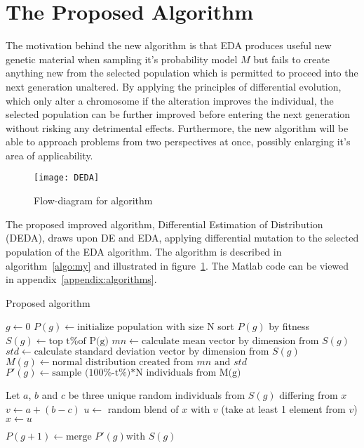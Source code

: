 \section{The Proposed Algorithm}

The motivation behind the new algorithm is that EDA produces useful new genetic material when sampling it's probability model $M$ but fails to create anything new from the selected population which is permitted to proceed into the next generation unaltered. By applying the principles of differential evolution, which only alter a chromosome if the alteration improves the individual, the selected population can be further improved before entering the next generation without risking any detrimental effects. Furthermore, the new algorithm will be able to approach problems from two perspectives at once, possibly enlarging it's area of applicability.

\begin{figure}[H]
  \centering
  \texttt{[image: DEDA]}
  \caption{Flow-diagram for algorithm}
  \label{fig:flowalg}
\end{figure}

The proposed improved algorithm, Differential Estimation of Distribution (DEDA), draws upon DE and EDA, applying differential mutation to the selected population of the EDA algorithm. The algorithm is described in algorithm~\ref{algo:my} and illustrated in figure~\ref{fig:flowalg}. The Matlab code can be viewed in appendix~\ref{appendix:algorithms}.


\begin{algorithm}[h]
  \caption{Proposed algorithm}
  \label{algo:my}
    \begin{algorithmic}
      \State $g\gets 0$
      \State $P(g)\gets \text{initialize population with size N}$
      \Repeat
        \State sort $P(g)$ by fitness
        \State $S(g)\gets \text{top t\% of P(g)}$
        \State $mn\gets \text{calculate mean vector by dimension from } S(g)$
        \State $std\gets \text{calculate standard deviation vector by dimension from } S(g)$
        \State $M(g)\gets \text{normal distribution created from } mn \text{ and } std$
        \State $P'(g)\gets \text{sample (100\%-t\%)*N individuals from M(g)}$

          \State Let $a$, $b$ and $c$ be three unique random individuals from $S(g)$ differing from $x$
          \State $v\gets a+(b-c)$
          \State $u\gets$ random blend of $x$ with $v$ (take at least 1 element from $v$)
            \State $x\gets u$
          \EndIf
        \EndFor

        \State $P(g+1)\gets \text{merge } P'(g) \text{with } S(g)$
    \end{algorithmic}
\end{algorithm}

